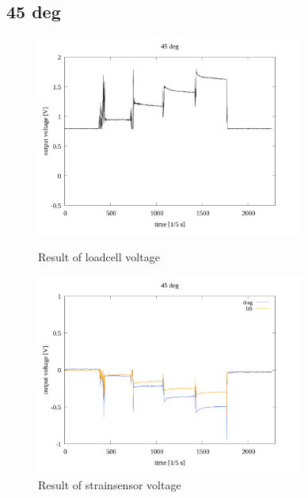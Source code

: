 \documentclass[twocolumn,a4j]{jsarticle}
\begin{document}
\subsection{45 deg}
\begin{figure}[htbp]
    \footnotesize
    \begin{center}
        \includegraphics[width=88mm]{../images/voltage-time/45_loadcell.png}
        \caption{Result of loadcell voltage}
        \includegraphics[width=88mm]{../images/voltage-time/45_strainsensor.png}
        \caption{Result of strainsensor voltage}
    \end{center}
\end{figure}

\newpage
\end{document}
